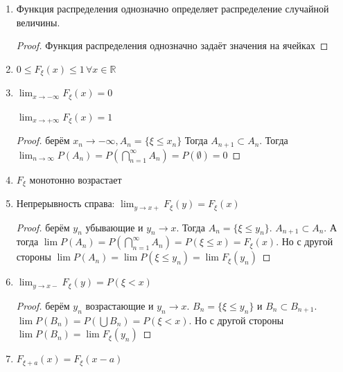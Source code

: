 \begin{properties}
    \begin{enumerate}
        \item {
        Функция распределения однозначно определяет распределение
        случайной величины.

        \begin{proof}
            Функция распределения однозначно задаёт значения на ячейках
        \end{proof} 
        }
        \item {
            $0 \leqslant F_{\xi}(x) \leqslant 1 \, \forall x \in \mathbb{R}$
        }

        \item {
            $\lim_{x \to -\infty} F_{\xi} (x) = 0$

            $\lim_{x \to +\infty} F_{\xi} (x) = 1$

            \begin{proof}
                берём $x_n \to -\infty, A_n = \{ \xi \leqslant x_n \} $
                Тогда $A_{n + 1} \subset A_n$. Тогда $\lim_{n \to \infty} P(A_n) = 
                P(\bigcap_{n = 1}^{\infty} A_n) = P(\emptyset) = 0$
            \end{proof}
        } 
        \item {
            $F_{\xi}$ монотонно возрастает
        }
        \item {
            Непрерывность справа: $\lim_{y \to x+} F_{\xi} (y) = F_{\xi} (x)$

            \begin{proof}
                берём $y_n$ убывающие и $y_n \to x$.
                Тогда $A_n = \{ \xi \leqslant y_n \}$. $A_{n + 1} \subset A_n$.
                А тогда $\lim P(A_n) = P(\bigcap_{n = 1}^{\infty} A_n) = P(\xi \leqslant x) = F_{\xi} (x)$.
                Но с другой стороны $\lim P(A_n) = \lim P(\xi \leqslant y_n) = \lim F_{\xi} (y_n)$
            \end{proof}

            }
        \item {
            $\lim_{y \to x-} F_{\xi} (y) = P(\xi < x)$

            \begin{proof}
                берём $y_n$ возрастающие и
                $y_n \to x$. $B_n = \{ \xi \leqslant y_n \}$ и $B_{n} \subset B_{n + 1}$.
                $\lim P(B_n) = P(\bigcup B_n) = P(\xi < x)$. Но с другой стороны
                $\lim P(B_n) = \lim F_{\xi} (y_n)$
            \end{proof}
        }
        \item {
            $F_{\xi + a} (x) = F_{\xi} (x - a)$

}
\end{enumerate}
\end{properties}
